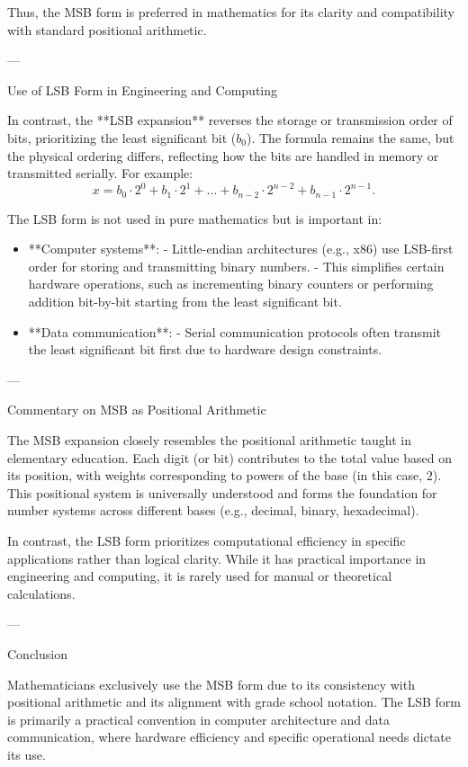 Thus, the MSB form is preferred in mathematics for its clarity and compatibility with standard positional arithmetic.

---

Use of LSB Form in Engineering and Computing

In contrast, the **LSB expansion** reverses the storage or transmission order of bits, prioritizing the least significant bit (\( b_0 \)). The formula remains the same, but the physical ordering differs, reflecting how the bits are handled in memory or transmitted serially. For example:
\[
x = b_0 \cdot 2^0 + b_1 \cdot 2^1 + \dots + b_{n-2} \cdot 2^{n-2} + b_{n-1} \cdot 2^{n-1}.
\]

The LSB form is not used in pure mathematics but is important in:
\begin{itemize}[noitemsep, left=1cm, topsep=0pt]
    \item **Computer systems**:
        - Little-endian architectures (e.g., x86) use LSB-first order for storing and transmitting binary numbers.
        - This simplifies certain hardware operations, such as incrementing binary counters or performing addition bit-by-bit starting from the least significant bit.
    \item **Data communication**:
        - Serial communication protocols often transmit the least significant bit first due to hardware design constraints.
\end{itemize}

---

Commentary on MSB as Positional Arithmetic

The MSB expansion closely resembles the positional arithmetic taught in elementary education. Each digit (or bit) contributes to the total value based on its position, with weights corresponding to powers of the base (in this case, \( 2 \)). This positional system is universally understood and forms the foundation for number systems across different bases (e.g., decimal, binary, hexadecimal).

In contrast, the LSB form prioritizes computational efficiency in specific applications rather than logical clarity. While it has practical importance in engineering and computing, it is rarely used for manual or theoretical calculations.

---

Conclusion

Mathematicians exclusively use the MSB form due to its consistency with positional arithmetic and its alignment with grade school notation. The LSB form is primarily a practical convention in computer architecture and data communication, where hardware efficiency and specific operational needs dictate its use.



